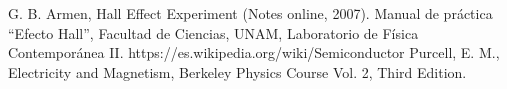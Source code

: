 \documentclass[twocolumn,showpacs,preprintnumbers,amsmath,amssymb]{revtex4-1}
\begin{document}
\begin{thebibliography}{101}

 G. B. Armen, Hall Effect Experiment (Notes online, 2007).
 Manual de práctica ``Efecto Hall'', Facultad de Ciencias, UNAM, Laboratorio de Física Contemporánea II.
 https://es.wikipedia.org/wiki/Semiconductor
 Purcell, E. M., Electricity and Magnetism, Berkeley Physics Course Vol. 2, Third Edition.



\end{thebibliography}

\end{document}
